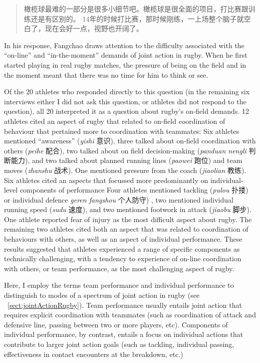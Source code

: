 \begin{CJK}{UTF8}{gbsn}
                \begin{quote}
                橄榄球最难的一部分是很多小细节吧。橄榄球是很全面的项目，打比赛跟训练还是有区别的。 14年的时候打比赛，那时候刚练，一上场整个脑子就空白了，现在会好一点，视野也开阔了。
                \end{quote}
In his response, Fangchao draws attention to the difficulty associated with the ``on-line'' and ``in-the-moment'' demands of joint action in rugby.  When he first started playing in real rugby matches, the pressure of being on the field and in the moment meant that there was no time for him to think or see.

Of the 20 athletes who responded directly to this question (in the remaining six interviews either I did not ask this question, or athletes did not respond to the question), all 20 interpreted it as a question about rugby's on-field demands.  12 athletes cited an aspect of rugby that related to on-field coordination of behaviour that pertained more to coordination with teammates:
Six athletes mentioned  ``awareness'' (\textit{yishi} 意识), three talked about on-field coordination with others (\textit{peihe} 配合), two talked about on field decision-making (\textit{panduan nengli} 判断能力), and two talked about planned running lines (\textit{paowei} 跑位) and team moves (\textit{zhanshu} 战术).
One mentioned pressure from the coach (\textit{jiaolian} 教练).
Six athletes cited an aspects that focussed more predominantly on individual-level  components of performance
Four athletes mentioned tackling (\textit{pulou} 扑搂) or individual defence \textit{geren fangshou} 个人防守) , two mentioned individual running speed (\textit{sudu} 速度), and two mentioned footwork in attack (\textit{jiaobu} 脚步).  One athlete reported fear of injury as the most difficult aspect about rugby.  The remaining two athletes cited both an aspect that was related to coordination of behaviours with others, as well as an aspect of individual performance.  These results suggested that athletes experienced a range of specific components as technically challenging, with a tendency to experience of on-line coordination with others, or team performance, as the most challenging aspect of rugby.

Here, I employ the terms team performance and individual performance to distinguish to modes of a spectrum of joint action in rugby (see ~\ref{sect:jointActionRugby}).
Team performance usually entails joint action that requires explicit coordination with teammates (such as coordination of attack and defensive line, passing between two or more players, etc).  Components of individual performance, by contrast, entails a focus on individual actions that contribute to larger joint action goals (such as tackling, individual passing, effectiveness in contact encounters at the breakdown, etc.)


\end{CJK}

